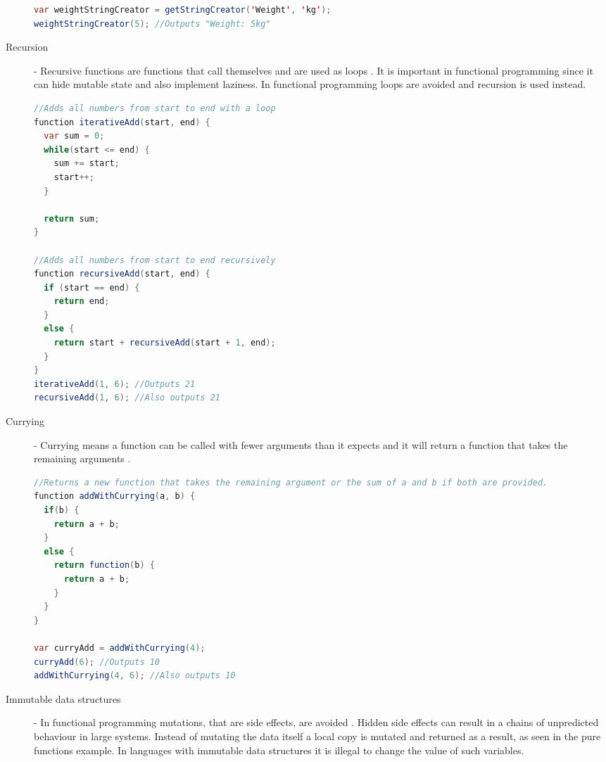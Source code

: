 \documentclass {article}
\begin{document}
\begin{description}
\begin{lstlisting}[language=Java, breaklines=true]
var weightStringCreator = getStringCreator('Weight', 'kg');
weightStringCreator(5); //Outputs "Weight: 5kg"
\end{lstlisting}

\item [Recursion] - Recursive functions are functions that call themselves and are used as loops \cite{fogus}. It is important in functional programming since it can hide mutable state and also implement laziness. In functional programming loops are avoided and recursion is used instead.

\begin{lstlisting}[language=Java]
//Adds all numbers from start to end with a loop
function iterativeAdd(start, end) {
  var sum = 0;
  while(start <= end) {
    sum += start;
    start++;
  }

  return sum;
}

//Adds all numbers from start to end recursively
function recursiveAdd(start, end) {
  if (start == end) {
    return end;
  }
  else {
    return start + recursiveAdd(start + 1, end);
  }
}
iterativeAdd(1, 6); //Outputs 21
recursiveAdd(1, 6); //Also outputs 21
\end{lstlisting}

\item [Currying] - Currying means a function can be called with fewer arguments than it expects and it will return a function that takes the remaining arguments \cite{drboolean}. 

\begin{lstlisting}[language=Java, breaklines=true]
//Returns a new function that takes the remaining argument or the sum of a and b if both are provided.
function addWithCurrying(a, b) {
  if(b) {
    return a + b;
  }
  else {
    return function(b) {
      return a + b;
    }
  }
}

var curryAdd = addWithCurrying(4); 
curryAdd(6); //Outputs 10
addWithCurrying(4, 6); //Also outputs 10
\end{lstlisting}

\item [Immutable data structures] - In functional programming mutations, that are side effects, are avoided \cite{fogus}. Hidden side effects can result in a chains of unpredicted behaviour in large systems. Instead of mutating the data itself a local copy is mutated and returned as a result, as seen in the pure functions example. In languages with immutable data structures it is illegal to change the value of such variables.
\end{description}
\end{document}
